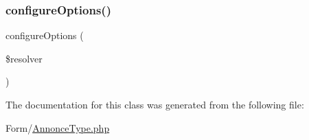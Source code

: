\mbox{\label{class_app_1_1_form_1_1_annonce_type_a8ff68a86f5090b5df973286836e46ead}} 
\subsubsection{\texorpdfstring{configureOptions()}{configureOptions()}}
{\footnotesize\ttfamily configure\+Options (\begin{DoxyParamCaption}\item[{Options\+Resolver}]{\$resolver }\end{DoxyParamCaption})}



The documentation for this class was generated from the following file\+:\begin{DoxyCompactItemize}
\item 
Form/\mbox{\hyperlink{_annonce_type_8php}{Annonce\+Type.\+php}}\end{DoxyCompactItemize}
